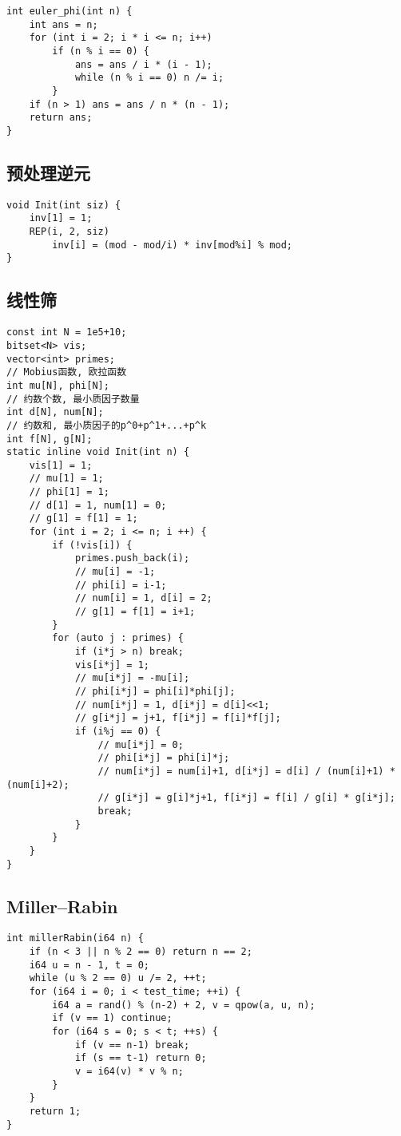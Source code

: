 \documentclass[a4paper,landscape,twocolumn]{ctexart}
\begin{document}
\begin{lstlisting}[]
int euler_phi(int n) {
	int ans = n;
	for (int i = 2; i * i <= n; i++)
		if (n % i == 0) {
			ans = ans / i * (i - 1);
			while (n % i == 0) n /= i;
		}
	if (n > 1) ans = ans / n * (n - 1);
	return ans;
}
\end{lstlisting}

\subsection{预处理逆元}

\begin{lstlisting}[]
void Init(int siz) {
	inv[1] = 1;
	REP(i, 2, siz)
		inv[i] = (mod - mod/i) * inv[mod%i] % mod;
}
\end{lstlisting}

\subsection{线性筛}

\begin{lstlisting}[]
const int N = 1e5+10;
bitset<N> vis;
vector<int> primes;
// Mobius函数, 欧拉函数
int mu[N], phi[N];
// 约数个数, 最小质因子数量
int d[N], num[N];
// 约数和, 最小质因子的p^0+p^1+...+p^k
int f[N], g[N];
static inline void Init(int n) {
	vis[1] = 1;
	// mu[1] = 1;
	// phi[1] = 1;
	// d[1] = 1, num[1] = 0;
	// g[1] = f[1] = 1;
	for (int i = 2; i <= n; i ++) {
		if (!vis[i]) {
			primes.push_back(i);
			// mu[i] = -1;
			// phi[i] = i-1;
			// num[i] = 1, d[i] = 2;
			// g[1] = f[1] = i+1;
		}
		for (auto j : primes) {
			if (i*j > n) break;
			vis[i*j] = 1;
			// mu[i*j] = -mu[i];
			// phi[i*j] = phi[i]*phi[j];
			// num[i*j] = 1, d[i*j] = d[i]<<1;
			// g[i*j] = j+1, f[i*j] = f[i]*f[j];
			if (i%j == 0) {
				// mu[i*j] = 0;
				// phi[i*j] = phi[i]*j;
				// num[i*j] = num[i]+1, d[i*j] = d[i] / (num[i]+1) * (num[i]+2);
				// g[i*j] = g[i]*j+1, f[i*j] = f[i] / g[i] * g[i*j];
				break;
			}
		}
	}
}
\end{lstlisting}

\subsection{Miller–Rabin}

\begin{lstlisting}[]
int millerRabin(i64 n) {
	if (n < 3 || n % 2 == 0) return n == 2;
	i64 u = n - 1, t = 0;
	while (u % 2 == 0) u /= 2, ++t;
	for (i64 i = 0; i < test_time; ++i) {
		i64 a = rand() % (n-2) + 2, v = qpow(a, u, n);
		if (v == 1) continue;
		for (i64 s = 0; s < t; ++s) {
			if (v == n-1) break;
			if (s == t-1) return 0;
			v = i64(v) * v % n;
		}
	}
	return 1;
}
\end{lstlisting}
\end{document}
